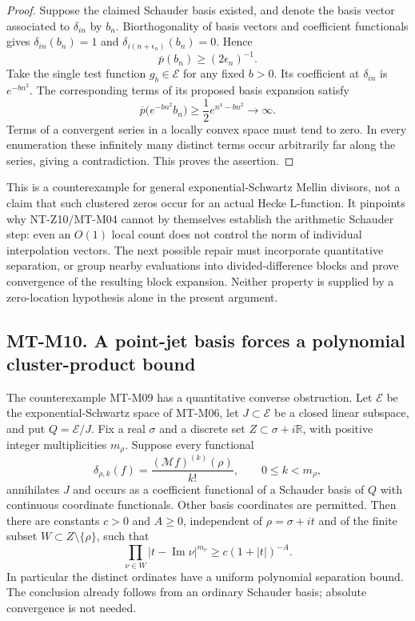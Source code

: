 \documentclass[11pt,a4paper]{article}
\begin{document}
\begin{proof}
Suppose the claimed Schauder basis existed, and denote the basis
vector associated to $\delta_{in}$ by $b_n$. Biorthogonality of
basis vectors and coefficient functionals gives
$\delta_{in}(b_n)=1$ and
$\delta_{i(n+\epsilon_n)}(b_n)=0$. Hence
\[
                 \overline p(b_n)\ge(2\epsilon_n)^{-1}.
\]
Take the single test function $g_b\in\mathcal E$ for any fixed
$b>0$. Its coefficient at $\delta_{in}$ is $e^{-bn^2}$.
The corresponding terms of its proposed basis expansion satisfy
\[
 \overline p\bigl(e^{-bn^2}b_n\bigr)
        \ge\frac12 e^{n^4-bn^2}\longrightarrow\infty.
\]
Terms of a convergent series in a locally convex space must tend
to zero. In every enumeration these infinitely many distinct terms
occur arbitrarily far along the series, giving a contradiction.
This proves the assertion.
\end{proof}

This is a counterexample for general exponential-Schwartz Mellin
divisors, not a claim that such clustered zeros occur for an actual
Hecke L-function. It pinpoints why NT-Z10/MT-M04 cannot by themselves
establish the arithmetic Schauder step: even an $O(1)$ local count
does not control the norm of individual interpolation vectors.
The next possible repair must incorporate quantitative separation,
or group nearby evaluations into divided-difference blocks and prove
convergence of the resulting block expansion. Neither property is
supplied by a zero-location hypothesis alone in the present argument.

\subsection*{MT-M10. A point-jet basis forces a polynomial cluster-product bound}
The counterexample MT-M09 has a quantitative converse obstruction.
Let $\mathcal E$ be the exponential-Schwartz space of MT-M06,
let $J\subset\mathcal E$ be a closed linear subspace, and put
$Q=\mathcal E/J$. Fix a real $\sigma$ and a discrete set
$Z\subset\sigma+i\mathbb R$, with positive integer multiplicities
$m_\rho$. Suppose every functional
\[
 \delta_{\rho,k}(f)=\frac{(\mathcal Mf)^{(k)}(\rho)}{k!},
 \qquad 0\le k<m_\rho,
\]
annihilates $J$ and occurs as a coefficient functional of a
Schauder basis of $Q$ with continuous coordinate functionals.
Other basis coordinates are permitted.
Then there are constants $c>0$ and $A\ge0$, independent of
$\rho=\sigma+it$ and of the finite subset
$W\subset Z\setminus\{\rho\}$, such that
\[
       \prod_{\nu\in W}|t-\operatorname{Im}\nu|^{m_\nu}
                    \ge c(1+|t|)^{-A}.                \tag{MT-M10}
\]
In particular the distinct ordinates have a uniform polynomial
separation bound. The conclusion already follows from an ordinary
Schauder basis; absolute convergence is not needed.
\end{document}
